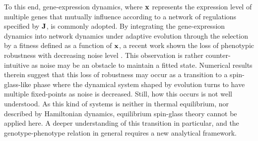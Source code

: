\documentclass[%
 reprint,
superscriptaddress,
 amsmath,amssymb,
 prl,
]{revtex4-2}
\begin{document}
To this end,   gene-expression
dynamics, where $\bold{x}$ represents the expression level of multiple genes
that mutually influence according to a 
 network of regulations specified by $\bold{J}$, is commonly adopted. 
By integrating the gene-expression dynamics into network dynamics under adaptive evolution through the selection by
a fitness defined as a function of $\bold{x}$,   a recent work shown the loss of  phenotypic robustness  with decreasing  noise level \cite{KanekoPloSOne2007}. This observation is rather counter-intuitive as  noise may be an obstacle to maintain a fitted state. Numerical results therein suggest that this loss of robustness may occur as a transition to a spin-glass-like phase where the  dynamical system shaped by evolution turns to have multiple fixed-points as noise is decreased. %
Still, how this occurs is
not well understood. 
As this kind of systems is neither in thermal equilibrium, nor described by Hamiltonian dynamics, equilibrium  spin-glass theory cannot be applied here. A deeper understanding of this transition in particular, and the genotype-phenotype relation in general requires a new analytical framework.
\end{document}
